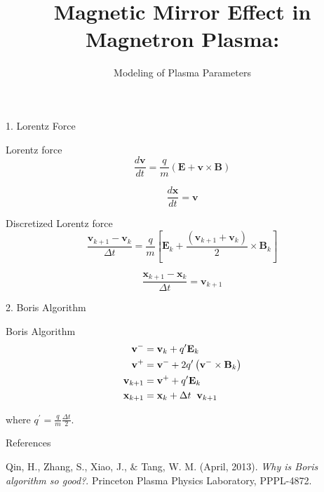 \documentclass{beamer}
\title[Interacting Manifolds]{Magnetic Mirror Effect in Magnetron Plasma:}
\subtitle{Modeling of Plasma Parameters}
\begin{document}
	
	\begin{frame}
		\titlepage	
	\end{frame}	
	
	\begin{frame}[t]{1. Lorentz Force }
	
	\begin{block}{Lorentz force}
		\begin{equation}
			\label{eqn:lorentz}
			\frac{d \textbf{v}}{d t} = \frac{q}{m} \left(\textbf{E} + \textbf{v} \times \textbf{B} \right)
		\end{equation}
	
	\end{block}
		\begin{equation}
			\label{eqn:velocity}
			\frac{d \textbf{x}}{d t} = \textbf{v}
		\end{equation}
	
	\begin{block}{Discretized Lorentz force}
		\begin{equation}
			\label{eqn:Dlorentz}
			\frac{\textbf{v}_{k+1} - \textbf{v}_{k}}{\Delta t} = \frac{q}{m} \left[\textbf{E}_{k} + \frac{\left( \textbf{v}_{k+1} + \textbf{v}_{k} \right) }{2} \times \textbf{B}_{k} \right] 
		\end{equation}
	\end{block}

	\begin{equation}
		\label{eqn:Dvelocity}
		\frac{\textbf{x}_{k+1} - \textbf{x}_{k} }{\Delta t} =	\textbf{v}_{k+1}
	\end{equation}

	\end{frame}
	
	\begin{frame}[t]{2. Boris Algorithm}
		\begin{block}{Boris Algorithm}
			\begin{equation}
				\begin{split}
					\textbf{v}^{-} & = \textbf{v}_{k} + q^{\prime} \textbf{E}_{k} \\
					\textbf{v}^{+} & = \textbf{v}^{-} + 2 q^{\prime} \left( \textbf{v}^{-} \times \textbf{B}_{k} \right) \\
					\textbf{v}_{k+1} & = \textbf{v}^{+} + q^{\prime} \textbf{E}_{k} \\
					\textbf{x}_{k+1} & = \textbf{x}_{k} + \Delta t \hspace{0.2cm}\textbf{v}_{k+1}
				\end{split}
			\end{equation}
		\end{block}
		
		where $q^{\prime} = \frac{\displaystyle q}{\displaystyle m} \frac{\displaystyle \Delta t}{ 2}$.
	\end{frame}

	\begin{frame}[t]{References}
	\begin{thebibliography}{}
		\bibitem{Borisgood}
		Qin, H., Zhang, S., Xiao, J., $\&$ Tang, W. M. (April, 2013). \textit{Why is Boris algorithm so good?}. Princeton Plasma Physics Laboratory, PPPL-4872.
		
	\end{thebibliography}
	\end{frame}
\end{document}
